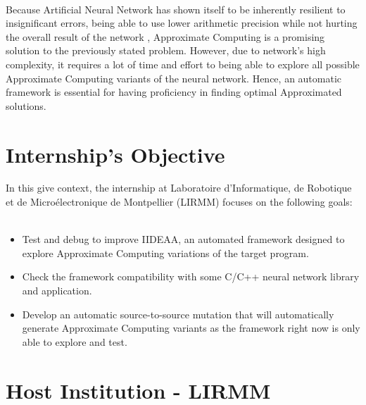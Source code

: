 ~\\
Because Artificial Neural Network has shown itself to be inherently resilient to insignificant errors, being able to use lower arithmetic precision while not hurting the overall result of the network \cite{DBLP:journals/corr/SungSH15}, Approximate Computing is a promising solution to the previously stated problem. However, due to network's high complexity, it requires a lot of time and effort to being able to explore all possible Approximate Computing variants of the neural network. Hence, an automatic framework is essential for having proficiency in finding optimal Approximated solutions. \\

\section{Internship's Objective}
In this give context, the internship at Laboratoire d'Informatique, de Robotique et de Microélectronique de Montpellier (LIRMM) focuses on the following goals: ~\\
\begin{itemize}
	\item Test and debug to improve IIDEAA, an automated framework designed to explore Approximate Computing variations of the target program.
	\item Check the framework compatibility with some C/C++ neural network library and application.
	\item Develop an automatic source-to-source mutation that will automatically generate Approximate Computing variants as the framework right now is only able to explore and test. 
\end{itemize}

\section{Host Institution - LIRMM}

